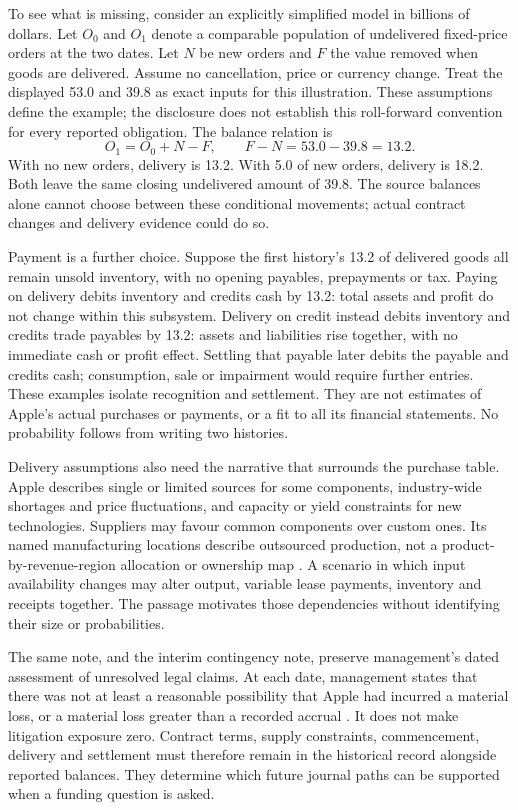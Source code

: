To see what is missing, consider an explicitly simplified model in billions
of dollars. Let $O_0$ and $O_1$ denote a comparable population of undelivered
fixed-price orders at the two dates. Let $N$ be new orders and $F$ the value
removed when goods are delivered. Assume no cancellation, price or currency
change. Treat the displayed 53.0 and 39.8 as exact inputs for this illustration.
These assumptions define the example; the disclosure does not establish this
roll-forward convention for every reported obligation. The balance relation is
\begin{equation}
 O_1=O_0+N-F,\qquad F-N=53.0-39.8=13.2.
 \label{eq:apple-commitment-movement}
\end{equation}
With no new orders, delivery is 13.2. With 5.0 of new orders, delivery is 18.2.
Both leave the same closing undelivered amount of 39.8. The source balances
alone cannot choose between these conditional movements; actual contract
changes and delivery evidence could do so.

Payment is a further choice. Suppose the first history's 13.2 of delivered
goods all remain unsold inventory, with no opening payables, prepayments or tax.
Paying on delivery debits inventory and credits cash by 13.2: total assets and
profit do not change within this subsystem. Delivery on credit instead debits
inventory and credits trade payables by 13.2: assets and liabilities rise
together, with no immediate cash or profit effect. Settling that payable later
debits the payable and credits cash; consumption, sale or impairment would
require further entries. These examples isolate recognition and settlement.
They are not estimates of Apple's actual purchases or payments, or a fit to
all its financial statements. No probability follows from writing two histories.

Delivery assumptions also need the narrative that surrounds the purchase
table. Apple describes single or limited sources for some components,
industry-wide shortages and price fluctuations, and capacity or yield
constraints for new technologies. Suppliers may favour common components over
custom ones. Its named manufacturing locations describe outsourced production,
not a product-by-revenue-region allocation or ownership map
\citep[Note 12, printed p.~46]{apple2024}. A scenario in which input availability
changes may alter output, variable lease payments, inventory and receipts
together. The passage motivates those dependencies without identifying their
size or probabilities.

The same note, and the interim contingency note, preserve management's dated
assessment of unresolved legal claims. At each date, management states that
there was not at least a reasonable possibility that Apple had incurred a
material loss, or a material loss greater than a recorded accrual
\citep[Note 12, printed p.~46]{apple2024}
\citep[Note 9, printed p.~11]{apple2025q1}. It does not make litigation exposure
zero. Contract terms, supply constraints, commencement, delivery and settlement
must therefore remain in the historical record alongside reported balances.
They determine which future journal paths can be supported when a funding
question is asked.

